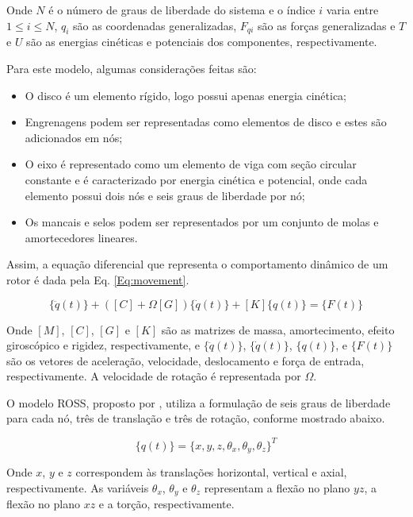 \documentclass[10pt,fleqn,a4paper,twoside]{article}
\begin{document}
	Onde $N$ é o número de graus de liberdade do sistema e o índice $i$ varia entre $1 \leq i \leq N$, $q_{i}$ são as coordenadas generalizadas, $F_{qi}$ são as forças generalizadas e $T$ e $U$ são as energias cinéticas e potenciais dos componentes, respectivamente.
	
	Para este modelo, algumas considerações feitas são:
	\begin{itemize}
		\item O disco é um elemento rígido, logo possui apenas energia cinética;
		\item Engrenagens podem ser representadas como elementos de disco e estes são adicionados em nós;
		\item O eixo é representado como um elemento de viga com seção circular constante e é caracterizado por energia cinética e potencial, onde cada elemento possui dois nós e seis graus de liberdade por nó;
		\item Os mancais e selos podem ser representados por um conjunto de molas e amortecedores lineares.
	\end{itemize}
	
	Assim, a equação diferencial que representa o comportamento dinâmico de um rotor é dada pela Eq. \ref{Eq:movement}.
	
	\begin{equation}
		[M]\{\ddot{q}(t)\}+([C]+\Omega [G])\{\dot{q}(t)\}+[K]\{q(t)\}=\{F(t)\}
		\label{Eq:movement}
	\end{equation}
	
	Onde $[M]$, $[C]$, $[G]$ e $[K]$ são as matrizes de massa, amortecimento, efeito giroscópico e rigidez, respectivamente, e $\{\ddot{q}(t)\}$, $\{\dot{q}(t)\}$, $\{q(t)\}$, e $\{F(t)\}$ são os vetores de aceleração, velocidade, deslocamento e força de entrada, respectivamente. A velocidade de rotação é representada por $\Omega$.
	
	O modelo ROSS, proposto por \citet{ross}, utiliza a formulação de seis graus de liberdade para cada nó, três de translação e três de rotação, conforme mostrado abaixo.
	
	\begin{equation}
		\{q(t)\} = \{x,y,z, \theta_x, \theta_y, \theta_z\}^{T}
		\label{Eq:dof}
	\end{equation}
	
	Onde $x$, $y$ e $z$ correspondem às translações horizontal, vertical e axial, respectivamente. As variáveis $\theta_x$, $\theta_y$ e $\theta_z$ representam a flexão no plano $yz$, a flexão no plano $xz$ e a torção, respectivamente.
	
\end{document}
